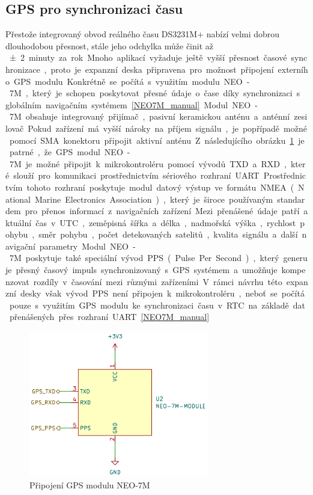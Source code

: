 \subsection{GPS pro synchronizaci času}
Přestože integrovaný obvod reálného času DS3231M+ nabízí velmi dobrou dlouhodobou přesnost, stále jeho odchylka může činit až \SI{\pm2} minuty za rok. Mnoho aplikací vyžaduje ještě vyšší přesnost časové synchronizace, proto je expanzní deska připravena pro možnost připojení externího GPS modulu. Konkrétně se~počítá s využitím modulu NEO-7M, který je schopen poskytovat přesné údaje o~čase díky synchronizaci s globálním navigačním systémem.~\ref{NEO7M_manual}

Modul NEO-7M obsahuje integrovaný přijímač, pasivní keramickou anténu a~anténní zesilovač. Pokud zařízení má vyšší nároky na příjem signálu, je popřípadě možné pomocí SMA konektoru připojit aktivní anténu. Z následujícího obrázku~\ref{fig:neo-7m} je patrné, že GPS modul NEO-7M je možné připojit k~mikrokontroléru pomocí vývodů TXD a~RXD, které slouží pro komunikaci prostřednictvím sériového rozhraní UART. Prostřednictvím tohoto rozhraní poskytuje modul datový výstup ve~formátu NMEA (National Marine Electronics Association), který je široce používaným standardem pro přenos informací z~navigačních zařízení. Mezi přenášené údaje patří aktuální čas v~UTC, zeměpisná šířka a~délka, nadmořská výška, rychlost pohybu, směr pohybu, počet detekovaných satelitů, kvalita signálu a~další navigační parametry. Modul NEO-7M poskytuje také speciální vývod PPS (Pulse Per Second), který generuje přesný časový impuls synchronizovaný s GPS systémem a~umožňuje kompenzovat rozdíly v časování mezi různými zařízeními. V~rámci návrhu této expanzní desky však vývod PPS není připojen k~mikrokontroléru, neboť se~počítá pouze s~využitím GPS modulu ke~synchronizaci času v~RTC na~základě dat přenášených přes rozhraní UART.~\ref{NEO7M_manual}

\begin{figure}[h]
    \centering
    \includegraphics[width=0.70\textwidth]{obrazky-figures/neo-7m.pdf}
    
    \caption{Připojení GPS modulu NEO-7M}
    \label{fig:neo-7m}
\end{figure}

